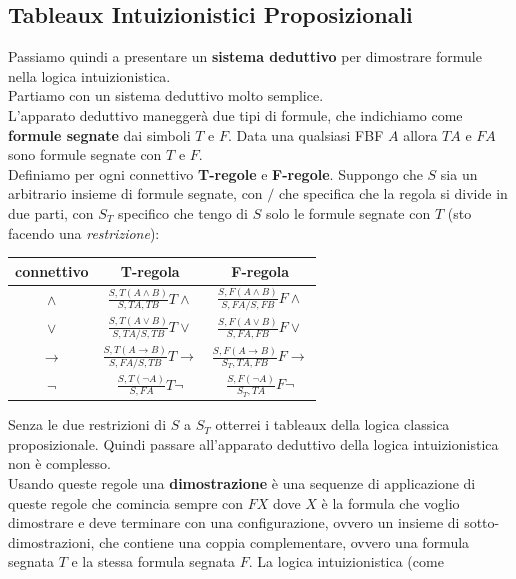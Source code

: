 \documentclass[a4paper,12pt, oneside]{book}
\begin{document}
\subsection{Tableaux Intuizionistici Proposizionali}
Passiamo quindi a presentare un \textbf{sistema deduttivo} per dimostrare
formule nella logica intuizionistica.\\
Partiamo con un sistema deduttivo molto semplice.\\
L'apparato deduttivo maneggerà due tipi di formule, che indichiamo come
\textbf{formule segnate} dai simboli $T$ e $F$. Data una qualsiasi FBF $A$
allora $TA$ e $FA$ sono formule segnate con $T$ e $F$.\\
Definiamo per ogni connettivo \textbf{T-regole} e \textbf{F-regole}. Suppongo
che $S$ sia un arbitrario insieme di formule segnate, con $/$ che specifica che
la regola si divide in due parti, con $S_T$ specifico che tengo di $S$ solo le
formule segnate con $T$ (sto facendo una \textit{restrizione}):
\begin{table}[H]
  \Large
  \centering
  \begin{tabular}{c||c|c}
    connettivo& T-regola& F-regola\\
    \hline
    \hline
    $\land$ & $\frac{S,T(A\land B)}{S,TA,TB}T\land$&
                        $\frac{S,F(A\land B)}{S,FA/S,FB}F\land$\\
    \hline
    $\lor$ & $\frac{S,T(A\lor B)}{S,TA/S,TB}T\lor$&
                        $\frac{S,F(A\lor B)}{S,FA,FB}F\lor$\\
    \hline
    $\to$ & $\frac{S,T(A\to B)}{S,FA/S,TB}T\to$&
                        $\frac{S,F(A\to B)}{S_T,TA,FB}F\to$\\
    \hline
    $\neg$ & $\frac{S,T(\neg A)}{S,FA}T\neg$&
                        $\frac{S,F(\neg A)}{S_T,TA}F\neg$\\
    \hline
  \end{tabular}
\end{table}
Senza le due restrizioni di $S$ a $S_T$ otterrei i tableaux della logica classica
proposizionale. Quindi passare all'apparato deduttivo della logica
intuizionistica non è complesso.\\
Usando queste regole una \textbf{dimostrazione} è una sequenze di applicazione
di queste regole che comincia sempre con $FX$ dove $X$ è la formula che voglio
dimostrare e deve terminare con una configurazione, ovvero un insieme di
sotto-dimostrazioni, che contiene una coppia complementare, ovvero una formula
segnata $T$ e la stessa formula segnata $F$. La logica intuizionistica (come 
\end{document}
